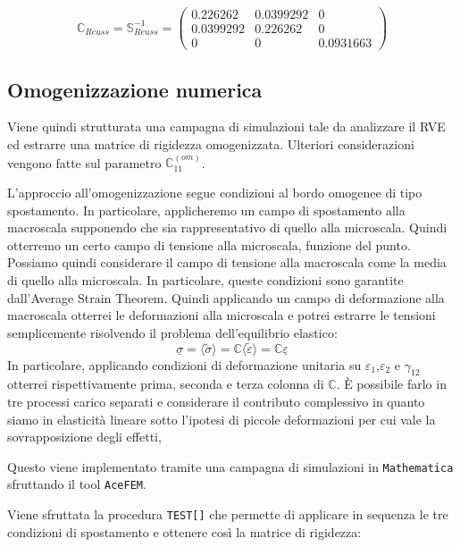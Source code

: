 \documentclass[a4paper,num-refs]{oup-contemporary}
\begin{document}
\begin{equation}
	\mathbb C_{Reuss}=\mathbb S_{Reuss}^{-1}=\begin{pmatrix}
0.226262&0.0399292&0\\
0.0399292&0.226262&0\\
0&0&0.0931663
	\end{pmatrix}
\end{equation}


\subsection{Omogenizzazione numerica}
\label{sec:homogen}

Viene quindi strutturata una campagna di simulazioni tale da analizzare il RVE ed estrarre una matrice di rigidezza omogenizzata. Ulteriori considerazioni vengono fatte sul parametro $\mathbb C_{11}^{(om)}$.

L'approccio all'omogenizzazione segue condizioni al bordo omogenee di tipo spostamento.  
In particolare, applicheremo un campo di spostamento alla macroscala supponendo che sia rappresentativo di quello alla microscala. Quindi otterremo un certo campo di tensione alla microscala, funzione del punto. Possiamo quindi considerare il campo di tensione alla macroscala come la media di quello alla microscala. In particolare, queste condizioni sono garantite dall'Average Strain Theorem. Quindi applicando un campo di deformazione alla macroscala otterrei le deformazioni alla microscala e potrei estrarre le tensioni semplicemente risolvendo il problema dell'equilibrio elastico:
\begin{equation}
\underline{\sigma}=\langle\tilde{\sigma}\rangle=\mathbb C\langle\tilde{\varepsilon}\rangle=\mathbb C \underline{\varepsilon}
\end{equation}
In particolare, applicando condizioni di deformazione unitaria su $\varepsilon_1$,$\varepsilon_2$ e $\gamma_{12}$ otterrei rispettivamente prima, seconda e terza colonna di $\mathbb C$. È possibile farlo in tre processi carico separati e considerare il contributo complessivo in quanto siamo in elasticità lineare sotto l'ipotesi di piccole deformazioni per cui vale la sovrapposizione degli effetti,


Questo viene implementato tramite una campagna di simulazioni in \texttt{Mathematica} sfruttando il tool \texttt{AceFEM}. 

Viene sfruttata la procedura \texttt{TEST[]} che permette di applicare in sequenza le tre condizioni di spostamento e ottenere così la matrice di rigidezza:
\end{document}
